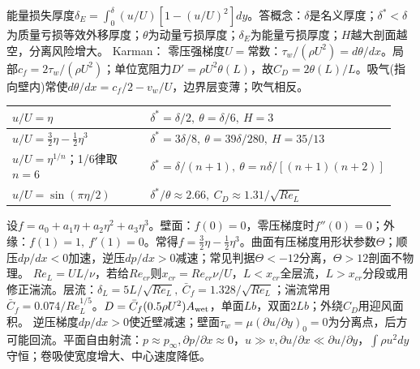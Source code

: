能量损失厚度$\delta_E=\int_0^\delta(u/U)[1-(u/U)^2]dy$。答概念：$\delta$是名义厚度；$\delta^*<\delta$为质量亏损等效外移厚度；$\theta$为动量亏损厚度；$\delta_E$为能量亏损厚度；$H$越大剖面越空，分离风险增大。
Karman：
零压强梯度$U=$常数：$\tau_w/(\rho U^2)=d\theta/dx$。局部$c_f=2\tau_w/(\rho U^2)$；单位宽阻力$D'=\rho U^2\theta(L)$，故$C_D=2\theta(L)/L$。吸气(指向壁内)常使$d\theta/dx=c_f/2-v_w/U$，边界层变薄；吹气相反。
\begin{tabular}{|p{0.42\linewidth}|p{0.52\linewidth}|}\hline
$u/U=\eta$ & $\delta^*=\delta/2,\ \theta=\delta/6,\ H=3$\\\hline
$u/U=\frac32\eta-\frac12\eta^3$ & $\delta^*=3\delta/8,\ \theta=39\delta/280,\ H=35/13$\\\hline
$u/U=\eta^{1/n}$；1/6律取$n=6$ & $\delta^*=\delta/(n+1),\ \theta=n\delta/[(n+1)(n+2)]$\\\hline
$u/U=\sin(\pi\eta/2)$ & $\delta^*/\theta\approx2.66,\ C_D\approx1.31/\sqrt{Re_L}$\\\hline
\end{tabular}
设$f=a_0+a_1\eta+a_2\eta^2+a_3\eta^3$。壁面：$f(0)=0$，零压梯度时$f''(0)=0$；外缘：$f(1)=1,\ f'(1)=0$。常得$f=\frac32\eta-\frac12\eta^3$。曲面有压梯度用形状参数$\Theta$；顺压$dp/dx<0$加速，逆压$dp/dx>0$减速；常见判据$\Theta<-12$分离，$\Theta>12$剖面不物理。
$Re_L=UL/\nu$，若给$Re_{cr}$则$x_{cr}=Re_{cr}\nu/U$，$L<x_{cr}$全层流，$L>x_{cr}$分段或用修正湍流。层流：$\delta_L=5L/\sqrt{Re_L},\ \bar C_f=1.328/\sqrt{Re_L}$；湍流常用$\bar C_f=0.074/Re_L^{1/5}$。$D=\bar C_f(0.5\rho U^2)A_{\rm wet}$，单面$Lb$，双面$2Lb$；外绕$C_D$用迎风面积。
逆压梯度$dp/dx>0$使近壁减速；壁面$\tau_w=\mu(\partial u/\partial y)_0=0$为分离点，后方可能回流。平面自由射流：$p\approx p_\infty,\partial p/\partial x\approx0$，$u\gg v,\partial u/\partial x\ll\partial u/\partial y$，$\int\rho u^2dy$守恒；卷吸使宽度增大、中心速度降低。

